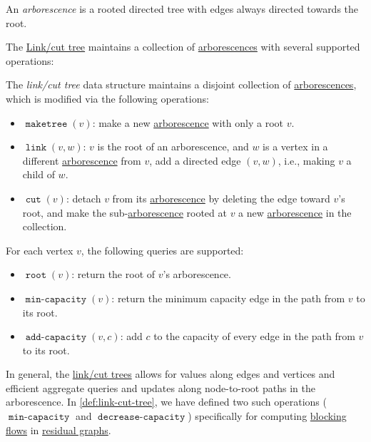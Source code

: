 \begin{definition}[Arborescence]\label{def:arborescence}
	An \emph{arborescence} is a rooted directed tree with edges always directed towards the root.
\end{definition}

The \hyperref[def:link-cut-tree]{Link/cut tree} maintains a collection of \hyperref[def:arborescence]{arborescences} with several supported operations:

\begin{definition}\label{def:link-cut-tree}
	The \emph{link/cut tree} data structure maintains a disjoint collection of \hyperref[def:arborescence]{arborescences}, which is modified via the following operations:
	\begin{itemize}
		\item \(\operatorname{\texttt{maketree}}(v) \): make a new \hyperref[def:arborescence]{arborescence} with only a root \(v\).
		\item \(\operatorname{\texttt{link}}(v, w) \): \(v\) is the root of an arborescence, and \(w\) is a vertex in a different \hyperref[def:arborescence]{arborescence} from \(v\), add a directed edge \((v, w)\), i.e., making \(v\) a child of \(w\).
		\item \(\operatorname{\texttt{cut}}(v) \): detach \(v\) from its \hyperref[def:arborescence]{arborescence} by deleting the edge toward \(v\)'s root, and make the sub-\hyperref[def:arborescence]{arborescence} rooted at \(v\) a new \hyperref[def:arborescence]{arborescence} in the collection.
	\end{itemize}
	For each vertex \(v\), the following queries are supported:
	\begin{itemize}
		\item \(\operatorname{\texttt{root}}(v) \): return the root of \(v\)'s arborescence.
		\item \(\operatorname{\texttt{min-capacity}}(v) \): return the minimum capacity edge in the path from \(v\) to its root.
		\item \(\operatorname{\texttt{add-capacity}}(v, c) \): add \(c\) to the capacity of every edge in the path from \(v\) to its root.
	\end{itemize}
\end{definition}

\begin{remark}
	In general, the \hyperref[def:link-cut-tree]{link/cut trees} allows for values along edges and vertices and efficient aggregate queries and updates along node-to-root paths in the arborescence. In \autoref{def:link-cut-tree}, we have defined two such operations (\(\operatorname{\texttt{min-capacity}}\) and \(\operatorname{\texttt{decrease-capacity}}\)) specifically for computing \hyperref[def:blocking-flow]{blocking flows} in \hyperref[def:residual-graph]{residual graphs}.
\end{remark}

